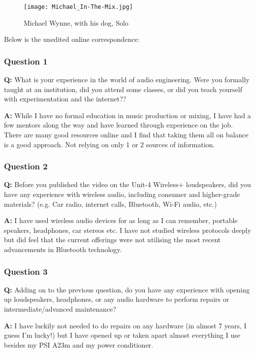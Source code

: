 \documentclass[conference]{IEEEtran}
\begin{document}
\begin{figure}[htbp]
    \centering
    \texttt{[image: Michael\_In-The-Mix.jpg]}
    \caption{Michael Wynne, with his dog, Solo}
    \label{fig:in-the-mix_portrait}
\end{figure}

Below is the unedited online correspondence:

\subsubsection*{Question 1}
\textbf{Q:} What is your experience in the world of audio engineering. Were you formally
taught at an institution, did you attend some classes, or did you teach yourself with
experimentation and the internet??

\textbf{A:} While I have no formal education in music production or mixing, I have had a few
mentors along the way and have learned through experience on the job. There are many good
resources online and I find that taking them all on balance is a good approach. Not relying
on only 1 or 2 sources of information. \cite{wynne_interviewing_2023}

\subsubsection*{Question 2}
\textbf{Q:} Before you published the video on the Unit-4 Wireless+ loudspeakers, did you have
any experience with wireless audio, including consumer and higher-grade materials? (e.g. Car
radio, internet calls, Bluetooth, Wi-Fi audio, etc.)


\textbf{A:}  I have used wireless audio devices for as long as I can remember, portable
speakers, headphones, car stereos etc. I have not studied wireless protocols deeply but did
feel that the current offerings were not utilising the most recent advancements in Bluetooth
technology. \cite{wynne_interviewing_2023}

\subsubsection*{Question 3}
\textbf{Q:} Adding on to the previous question, do you have any experience with opening up
loudspeakers, headphones, or any audio hardware to perform repairs or intermediate/advanced
maintenance?

\textbf{A:} I have luckily not needed to do repairs on any hardware (in almost 7 years, I
guess I'm lucky!) but I have opened up or taken apart almost everything I use besides my PSI
A23m and my power conditioner. \cite{wynne_interviewing_2023}
\end{document}
